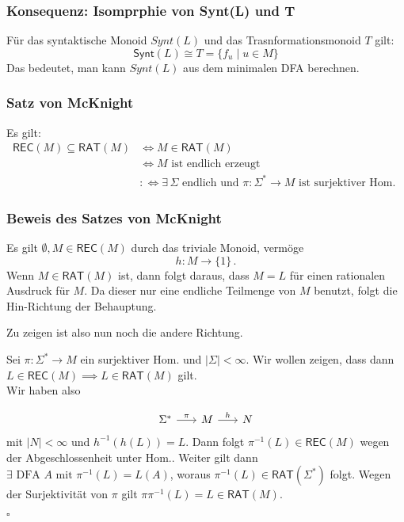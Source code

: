 \documentclass[12pt, german]{article}
\newcommand{\sigstern}{\Sigma^\ast}
\newcommand{\inv}{^{-1}}
\newcommand{\rat}{\mathsf{RAT}}
\newcommand{\rec}{\mathsf{REC}}
\newcommand{\synt}{\mathsf{Synt}}
\newcommand{\bewiesen}{
	
	\begin{flushright}
		$\square$  \\
\end{flushright}}
\begin{document}
	\subsubsection{Konsequenz: Isomprphie von Synt(L) und T}
	Für das syntaktische Monoid $Synt(L)$ und das Trasnformationsmonoid $T$ gilt:
	$$\synt(L) \cong T = \{f_u \mid u \in M\}$$
	Das bedeutet, man kann $Synt(L)$ aus dem minimalen DFA berechnen.
	
	\subsubsection{Satz von McKnight}
	Es gilt: 
	\begin{align*}
		\rec(M) \subseteq \rat(M) &\iff M \in \rat(M)\\ 
		&\iff M \text{ ist endlich erzeugt} \\ 
		&:\iff \exists \, \Sigma \text{ endlich und } \pi : \sigstern \to M \text{ ist surjektiver Hom. }
	\end{align*}
	
	\subsubsection{Beweis des Satzes von McKnight}
	Es gilt $\emptyset, M \in \rec(M)$ durch das triviale Monoid, vermöge $$h: M \to \{1\}\, .$$ Wenn $M \in \rat(M)$ ist, dann folgt daraus, dass $M=L$ für einen rationalen Ausdruck für $M$. 
	Da dieser nur eine endliche Teilmenge von $M$ benutzt, folgt die Hin-Richtung der Behauptung.
	
	Zu zeigen ist also nun noch die andere Richtung. 
	\newline
	
	Sei $\pi : \sigstern \to M$ ein surjektiver Hom. und $|\Sigma| < \infty$. 
	Wir wollen zeigen, dass dann $L \in \rec(M) \implies L \in \rat(M)$ gilt.\\
	Wir haben also
	
	\begin{equation*}
		\begin{tikzcd}[column sep=1.5pc]
			\sigstern \arrow{r}{\pi} & M \arrow{r}{h} & N 
		\end{tikzcd}
	\end{equation*}
	mit $|N| < \infty$ und $h\inv(h(L)) = L$. Dann folgt $\pi\inv(L) \in \rec(M)$ wegen der Abgeschlossenheit unter Hom..
	Weiter gilt dann $\exists \text{ DFA } A \text{ mit } \pi\inv(L) = L(A)$, woraus $\pi\inv(L) \in \rat(\Sigma^*)$ folgt.
	Wegen der Surjektivität von $\pi$ gilt $\pi\pi\inv(L) = L \in \rat(M)$.
	\bewiesen
	
\end{document}
